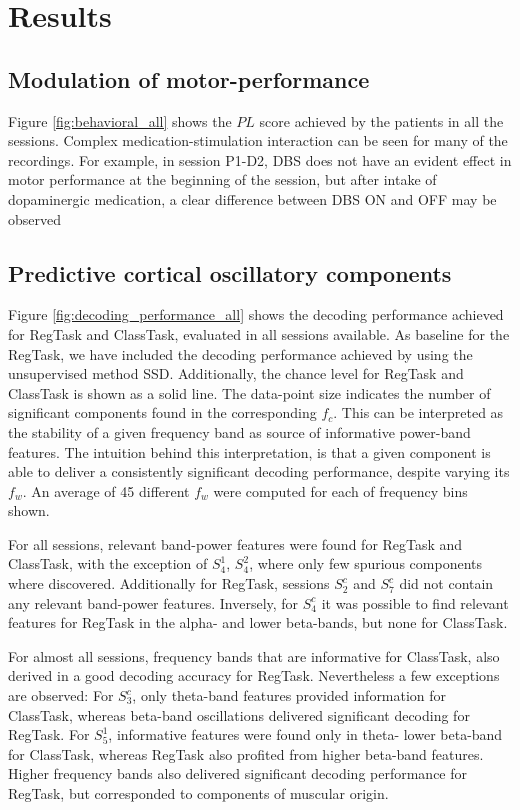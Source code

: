 \documentclass[10pt,a4paper, twocolumn]{article}
\newcommand{\patient}[2]{$S_{#1}^{#2}$}
\newcommand{\regtask}{RegTask\xspace}
\newcommand{\classtask}{ClassTask\xspace}
\begin{document}
\section{Results}

\subsection{Modulation of motor-performance}
Figure \ref{fig:behavioral_all} shows the $PL$ score achieved by the patients in all the sessions. Complex medication-stimulation interaction can be seen for many of the recordings. For example, in session P1-D2, DBS does not have an evident effect in motor performance at the beginning of the session, but after intake of dopaminergic medication, a clear difference between DBS ON and OFF may be observed





\subsection{Predictive cortical oscillatory components}


Figure \ref{fig:decoding_performance_all} shows the decoding performance achieved for \regtask and  \classtask, evaluated in all sessions available. As baseline for the \regtask, we have included the decoding performance achieved by using the unsupervised method SSD. Additionally, the chance level for \regtask and  \classtask is shown as a solid line. The data-point size indicates the number of significant components found in the corresponding $f_c$. This can be interpreted as the  stability of a given frequency band as source of informative power-band features. The intuition behind this interpretation, is that a given component is able to deliver a consistently significant decoding performance, despite varying its $f_w$. An average of 45 different $f_w$ were computed for each of frequency bins shown.

For all sessions, relevant band-power features were found for \regtask and  \classtask, with the exception of \patient{4}{1}, \patient{4}{2}, where only few spurious components where discovered. Additionally for \regtask, sessions  \patient{2}{c} and \patient{7}{c} did not contain any relevant band-power features. Inversely, for \patient{4}{c} it was possible to find relevant features for \regtask in the alpha- and lower beta-bands, but none for \classtask.
 
For almost all sessions, frequency bands that are informative for \classtask, also derived in a good decoding accuracy for \regtask. Nevertheless a few exceptions are observed: For \patient{3}{c}, only theta-band features provided information for \classtask, whereas beta-band oscillations delivered significant decoding for \regtask. For \patient{5}{1}, informative features were found only in theta- lower beta-band for \classtask, whereas \regtask also profited from higher beta-band features. Higher frequency bands also delivered significant decoding performance for \regtask, but corresponded to components of muscular origin.
\end{document}

